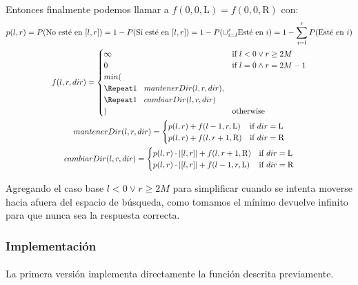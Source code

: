 \documentclass[../main.tex]{subfiles}
\begin{document}
\paragraph{} Entonces finalmente podemos llamar a \(f(0, 0, \text{L}) = f(0, 0, \text{R})\) con:
\begin{gather*}
  p(l, r) = P(\text{No esté en } [l, r]) = 1 - P(\text{Sí esté en } [l, r]) = 1 - P(\cup_{i = l}^{r} \text{Esté en } i) = 1 - \sum_{i = l}^{r}P(\text{Esté en } i) \\
  f(l, r, dir) = \begin{cases}
    \infty & \text{if } l < 0 \lor r \geq 2M \\
    0 & \text{if } l = 0 \land r = 2M-1 \\
    min( \\
    \tab mantenerDir(l, r, dir), \\
    \tab cambiarDir(l, r, dir) \\
    ) & \text{otherwise}
  \end{cases} \\
  mantenerDir(l, r, dir) = \begin{cases}
    p(l, r) + f(l-1, r, \text{L}) & \text{if } dir = \text{L} \\
    p(l, r) + f(l, r+1, \text{R}) & \text{if } dir = \text{R}
  \end{cases} \\
  cambiarDir(l, r, dir) = \begin{cases}
    p(l, r) \cdot |[l, r]| + f(l, r+1, \text{R}) & \text{if } dir = \text{L} \\
    p(l, r) \cdot |[l, r]| + f(l-1, r, \text{L}) & \text{if } dir = \text{R}
  \end{cases}
\end{gather*}

Agregando el caso base \(l < 0 \lor r \geq 2M\) para simplificar cuando se intenta moverse hacia afuera del espacio de búsqueda, como tomamos el mínimo devuelve infinito para que nunca sea la respuesta correcta.

\subsubsection{Implementación}

\paragraph{} La primera versión implementa directamente la función descrita previamente.

\end{document}
